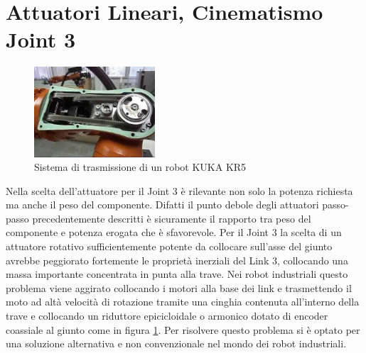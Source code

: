 \documentclass[%
corpo=11pt,
twoside,
 stile=classica,
oldstyle,
greek,%
]{toptesi}
\begin{document}
		
	
	
	\section{Attuatori Lineari, Cinematismo Joint 3}
	\begin{figure}
		\centering
		\includegraphics[width=0.4\textwidth]{image/kukabelt.jpg}
		\caption{Sistema di trasmissione di un robot KUKA KR5}
		\label{fig:kukabelt}
	\end{figure}
	Nella scelta dell'attuatore per il Joint 3 è rilevante non solo la potenza richiesta ma anche il peso del componente. Difatti il punto debole degli attuatori passo-passo precedentemente descritti è sicuramente il rapporto tra peso del componente e potenza erogata che è sfavorevole.
	Per il Joint 3 la scelta di un attuatore rotativo sufficientemente potente da collocare sull'asse del giunto avrebbe peggiorato fortemente le proprietà inerziali del Link 3, collocando una massa importante concentrata in punta alla trave. 
	Nei robot industriali questo problema viene aggirato collocando i motori alla base dei link e trasmettendo il moto ad altà velocità di rotazione tramite una cinghia contenuta all'interno della trave e collocando un riduttore epicicloidale o armonico dotato di encoder coassiale al giunto come in figura \ref{fig:kukabelt}. 
	Per risolvere questo problema si è optato per una soluzione alternativa e non convenzionale nel mondo dei robot industriali. 
	
\end{document}
